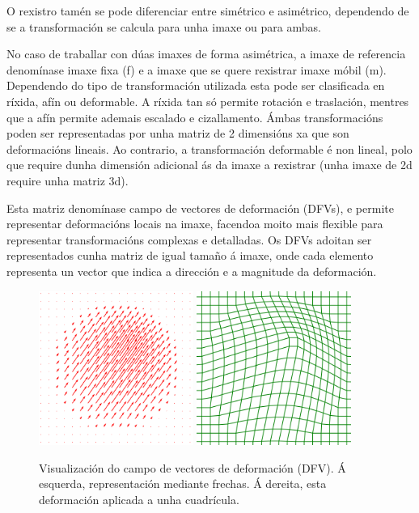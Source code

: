 O rexistro tamén se pode diferenciar entre simétrico e asimétrico, dependendo de se a transformación se calcula para unha imaxe ou para ambas.

No caso de traballar con dúas imaxes de forma asimétrica, a imaxe de referencia denomínase imaxe fixa (f) e a imaxe que se quere rexistrar imaxe móbil (m).
Dependendo do tipo de transformación utilizada esta pode ser clasificada en ríxida, afín ou deformable.
A ríxida tan só permite rotación e traslación, mentres que a afín permite ademais escalado e cizallamento.
Ámbas transformacións poden ser representadas por unha matriz de 2 dimensións xa que son deformacións lineais.
Ao contrario, a transformación deformable é non lineal, polo que require dunha dimensión adicional ás da imaxe a rexistrar (unha imaxe de 2d require unha matriz 3d).

Esta matriz denomínase campo de vectores de deformación (\gls{DFV}s), e permite representar deformacións locais na imaxe, facendoa moito mais flexible para representar transformacións complexas e detalladas.
Os DFVs adoitan ser representados cunha matriz de igual tamaño á imaxe, onde cada elemento representa un vector que indica a dirección e a magnitude da deformación.

\begin{figure}[ht!]
    \centering
    \includegraphics[width=0.45\textwidth]{imaxes/dfv_arrows.png}
    \includegraphics[width=0.45\textwidth]{imaxes/dfv_grid.png}
    \caption{Visualización do campo de vectores de deformación (DFV). Á esquerda, representación mediante frechas. Á dereita, esta deformación aplicada a unha cuadrícula.}
    \label{fig:dfv_visualization}
\end{figure}

